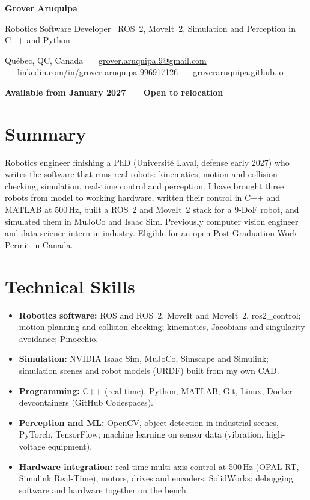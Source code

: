 \documentclass[10pt,letterpaper]{article}
\begin{document}
{\LARGE\bfseries Grover Aruquipa}\par\vspace{2pt}
{\large Robotics Software Developer \textbar\ ROS~2, MoveIt~2, Simulation and Perception in C++ and Python}\par\vspace{3pt}
{\small Qu\'ebec, QC, Canada \ \textbullet\ \
\href{mailto:grover.aruquipa.9@gmail.com}{grover.aruquipa.9@gmail.com} \ \textbullet\ \
\href{https://www.linkedin.com/in/grover-aruquipa-996917126}{linkedin.com/in/grover-aruquipa-996917126} \ \textbullet\ \
\href{https://groveraruquipa.github.io}{groveraruquipa.github.io}}\par\vspace{1pt}
{\small\bfseries Available from January 2027 \ \textbullet\ \ Open to relocation}\par


\section{Summary}
Robotics engineer finishing a PhD (Universit\'e Laval, defense early 2027) who writes the software that runs real robots:
kinematics, motion and collision checking, simulation, real-time control and perception. I have brought three robots from
model to working hardware, written their control in C++ and MATLAB at 500\,Hz, built a ROS~2 and MoveIt~2 stack for a
9-DoF robot, and simulated them in MuJoCo and Isaac Sim. Previously computer vision engineer and data science intern in
industry. Eligible for an open Post-Graduation Work Permit in Canada.

\section{Technical Skills}
\begin{itemize}
\item \textbf{Robotics software:} ROS and ROS~2, MoveIt and MoveIt~2, ros2\_control; motion planning and collision checking;
kinematics, Jacobians and singularity avoidance; Pinocchio.
\item \textbf{Simulation:} NVIDIA Isaac Sim, MuJoCo, Simscape and Simulink; simulation scenes and robot models (URDF) built
from my own CAD.
\item \textbf{Programming:} C++ (real time), Python, MATLAB; Git, Linux, Docker devcontainers (GitHub Codespaces).
\item \textbf{Perception and ML:} OpenCV, object detection in industrial scenes, PyTorch, TensorFlow; machine learning on
sensor data (vibration, high-voltage equipment).
\item \textbf{Hardware integration:} real-time multi-axis control at 500\,Hz (OPAL-RT, Simulink Real-Time), motors, drives
and encoders; SolidWorks; debugging software and hardware together on the bench.
\end{itemize}
\end{document}
